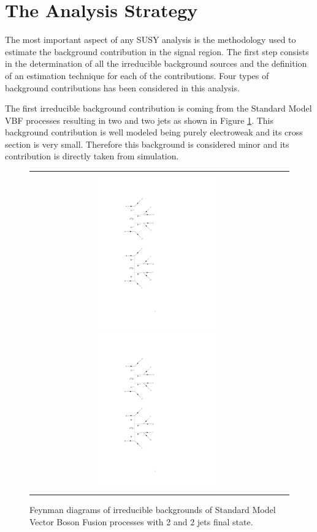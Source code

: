 \section{The Analysis Strategy}

The most important aspect of any SUSY analysis is the methodology used to estimate the background contribution in the signal region. The first step consists in the determination of all the irreducible background sources and the definition of an estimation technique for each of the contributions. Four types of background contributions has been considered in this analysis. 

The first irreducible background contribution is coming from the Standard Model VBF processes resulting in two \hadtau and two jets as shown in Figure \ref{fig:background_SMVBF}. This background contribution is well modeled being purely electroweak and its cross section is very small. Therefore this background is considered minor and its contribution is directly taken from simulation.

\begin{figure}[tbh!]
	\centering
	\begin{tabular}{cc}
		\includegraphics[width=0.50\textwidth]{diagrams/pics/background_SMVBFminus.pdf}
		\includegraphics[width=0.50\textwidth]{diagrams/pics/background_SMVBFplus.pdf} 		
	\end{tabular}
	\caption{Feynman diagrams of irreducible backgrounds of Standard Model Vector Boson Fusion processes with 2 \hadtau and 2 jets final state. }
	\label{fig:background_SMVBF}
\end{figure}

